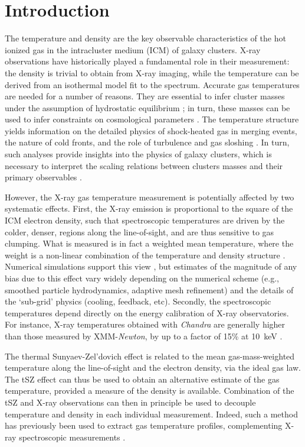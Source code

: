 \documentclass[twocolumn,traditabstract]{aa}
\newcommand{\ccor}[1]{\textcolor{Mypink}{#1}}
\begin{document}
\section{Introduction}\label{sec:Introduction}
The temperature and density are the key observable characteristics of the hot ionized gas in the intracluster medium (ICM) of galaxy clusters. X-ray observations have historically played a fundamental role in their measurement: the density is trivial to obtain from X-ray imaging, while the temperature can be derived from an isothermal model fit to the spectrum. Accurate gas temperatures are needed for a number of reasons. They are essential to infer cluster masses under the assumption of hydrostatic equilibrium \citep{Sarazin1988}; in turn, these masses can be used to infer constraints on cosmological parameters \citep[e.g.,][]{Allen2011}. The temperature structure yields information on the detailed physics of shock-heated gas in merging events, the nature of cold fronts, and the role of turbulence and gas sloshing \citep[see, e.g.,][for a review]{mar07}. In turn, such analyses provide insights into the physics of galaxy clusters, which is necessary to interpret the scaling relations between clusters masses and their primary observables \citep{Khedekar2013}.

However, the X-ray gas temperature measurement is potentially affected by two systematic effects. First, the X-ray emission is proportional to the square of the ICM electron density, such that spectroscopic temperatures are driven by the colder, denser, regions along the line-of-sight, and are thus sensitive to gas clumping. What is measured is in fact a weighted mean temperature, where the weight is a non-linear combination of the temperature and density structure \citep[see, e.g.,][]{maz04,vik06b}. Numerical simulations support this view \citep[e.g.,][]{Nagai2007,ras14}, but estimates of the magnitude of any bias due to this effect vary widely depending on the numerical scheme (e.g., smoothed particle hydrodynamics, adaptive mesh refinement) and the details of the `sub-grid' physics (cooling, feedback, etc). Secondly, the spectroscopic temperatures depend directly on the energy calibration of X-ray observatories. For instance, X-ray temperatures obtained with \textit{Chandra} are generally higher than those measured by XMM-\textit{Newton}, by up to a factor of 15\% at 10~keV \citep[e.g.,][]{Mahdavi2013}.

The thermal Sunyaev-Zel'dovich \citep[tSZ,][]{Sunyaev1972} effect is related to the mean gas-mass-weighted temperature along the line-of-sight and the electron density, via the ideal gas law. The tSZ effect can thus be used to obtain an alternative estimate of the gas temperature, provided a measure of the density is available. Combination of the tSZ and X-ray observations can then in principle be used to decouple temperature and density in each individual measurement. \ccor{Indeed, such a method has previously been used to extract gas temperature profiles, complementing X-ray spectroscopic measurements \citep[e.g.,][]{Pointecouteau2002,Kitayama2004,Nord2009,Basu2010,Eckert2013,Ruppin2016}.}
\end{document}
